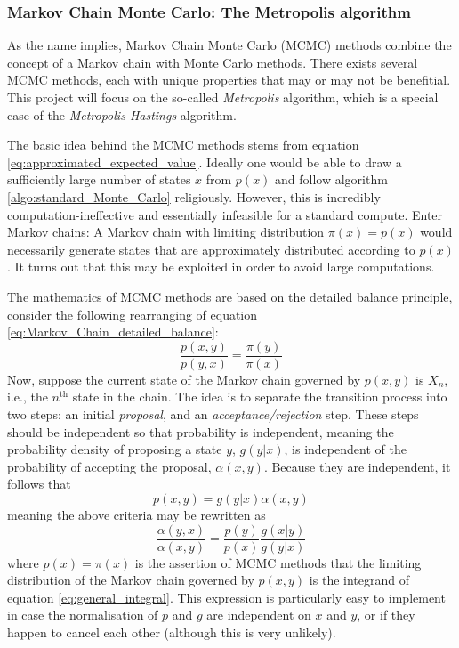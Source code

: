 \documentclass[nofootinbib,reprint,english]{revtex4-1}
\begin{document}
\subsubsection{Markov Chain Monte Carlo: The Metropolis algorithm}
As the name implies, Markov Chain Monte Carlo (MCMC) methods combine the concept of a Markov chain with Monte Carlo methods. There exists several MCMC methods, each with unique properties that may or may not be benefitial. This project will focus on the so-called \emph{Metropolis} algorithm, which is a special case of the \emph{Metropolis-Hastings} algorithm.

The basic idea behind the MCMC methods stems from equation \eqref{eq:approximated_expected_value}. Ideally one would be able to draw a sufficiently large number of states \(x\) from \(p(x)\) and follow algorithm \ref{algo:standard_Monte_Carlo} religiously. However, this is incredibly computation-ineffective and essentially infeasible for a standard compute. Enter Markov chains: A Markov chain with limiting distribution \(\pi(x)=p(x)\) would necessarily generate states that are approximately distributed according to \(p(x)\). It turns out that this may be exploited in order to avoid large computations.

The mathematics of MCMC methods are based on the detailed balance principle, consider the following rearranging of equation \eqref{eq:Markov_Chain_detailed_balance}:
\[\frac{p(x,y)}{p(y,x)}=\frac{\pi(y)}{\pi(x)}\]
Now, suppose the current state of the Markov chain governed by \(p(x,y)\) is \(X_n\), i.e., the \(n^\text{th}\) state in the chain. The idea is to separate the transition process into two steps: an initial \emph{proposal}, and an \emph{acceptance/rejection} step. These steps should be independent so that probability is independent, meaning the probability density of proposing a state \(y\), \(g(y|x)\), is independent of the probability of accepting the proposal, \(\alpha(x,y)\). Because they are independent, it follows that
\begin{equation}
p(x,y)=g(y|x)\alpha(x,y)
\end{equation}
meaning the above criteria may be rewritten as
\begin{equation}\label{eq:MCMC_detailed_balance_with_TandA}
\frac{\alpha(y,x)}{\alpha(x,y)}=\frac{p(y)}{p(x)}\frac{g(x|y)}{g(y|x)}
\end{equation}
where \(p(x)=\pi(x)\) is the assertion of MCMC methods that the limiting distribution of the Markov chain governed by \(p(x,y)\) is the integrand of equation \eqref{eq:general_integral}. This expression is particularly easy to implement in case the normalisation of \(p\) and \(g\) are independent on \(x\) and \(y\), or if they happen to cancel each other (although this is very unlikely).
\end{document}
